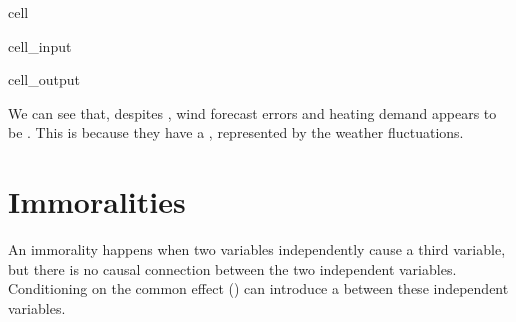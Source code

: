 \documentclass[letterpaper,10pt,english]{jupyterBook}
\begin{document}
\begin{sphinxuseclass}{cell}
\begin{sphinxVerbatimInput}
\begin{sphinxuseclass}{cell_input}
\begin{sphinxVerbatim}[commandchars=\\\{\}]
  \PYG{p}{[}\PYG{p}{]}\PYG{p}{[}\PYG{p}{]} \PYG{p}{[}\PYG{p}{]}   
\PYG{p}{[}\PYG{p}{]}
\PYG{p}{[}\PYG{p}{]}
\PYG{p}{[}\PYG{p}{]}

\end{sphinxVerbatim}

\end{sphinxuseclass}\end{sphinxVerbatimInput}
\begin{sphinxVerbatimOutput}

\begin{sphinxuseclass}{cell_output}
\noindent{}

\end{sphinxuseclass}\end{sphinxVerbatimOutput}

\end{sphinxuseclass}
\sphinxAtStartPar
We can see that, despites , wind forecast errors and heating demand appears to be . This is because they have a , represented by the weather fluctuations.


\section{Immoralities}
\label{\detokenize{notebooks/basic_dag_structures:immoralities}}
\sphinxAtStartPar
An immorality happens when two variables independently cause a third variable, but there is no causal connection between the two independent variables. Conditioning on the common effect () can introduce a  between these independent variables.
\end{document}

